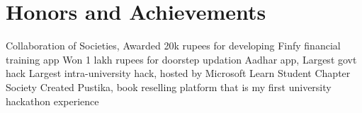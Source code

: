 \section{Honors and Achievements}
  \resumeSubHeadingListStart
      {Collaboration of Societies, Awarded 20k rupees for developing Finfy financial training app}
      {Won 1 lakh rupees for doorstep updation Aadhar app, Largest govt hack}
      {Largest intra-university hack, hosted by Microsoft Learn Student Chapter Society}
      {Created Pustika, book reselling platform that is my first university hackathon experience}
  \resumeSubHeadingListEnd